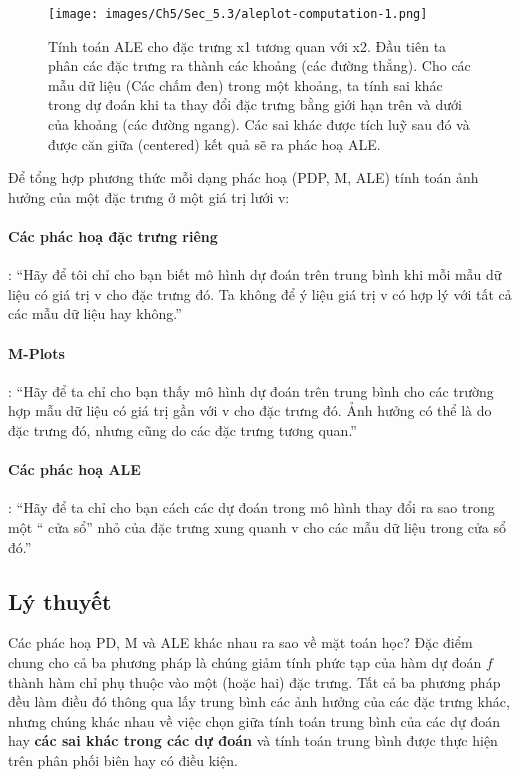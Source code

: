 \begin{figure*}[h!]
	\centering
	\texttt{[image: images/Ch5/Sec\_5.3/aleplot-computation-1.png]}
	\label{fig:5_12}
	\caption{Tính toán ALE cho đặc trưng x1 tương quan với x2. Đầu tiên ta phân các đặc trưng ra thành các khoảng (các đường thẳng). Cho các mẫu dữ liệu (Các chấm đen) trong một khoảng, ta tính sai khác trong dự đoán khi ta thay đổi đặc trưng bằng giới hạn trên và dưới của khoảng (các đường ngang). Các sai khác được tích luỹ sau đó và được căn giữa (centered) kết quả sẽ ra phác hoạ ALE.}
\end{figure*}

Để tổng hợp phương thức mỗi dạng phác hoạ (PDP, M, ALE) tính toán ảnh hưởng của một đặc trưng ở một giá trị lưới v:

\paragraph{Các phác hoạ đặc trưng riêng}: ``Hãy để tôi chỉ cho bạn biết mô hình dự đoán trên trung bình khi mỗi mẫu dữ liệu có giá trị v cho đặc trưng đó. Ta không để ý liệu giá trị v có hợp lý với tất cả các mẫu dữ liệu hay không.''
\paragraph{M-Plots}: ``Hãy để ta chỉ cho bạn thấy mô hình dự đoán trên trung bình cho các trường hợp mẫu dữ liệu có giá trị gần với v cho đặc trưng đó. Ảnh hưởng có thể là do đặc trưng đó, nhưng cũng do các đặc trưng tương quan.''
\paragraph{Các phác hoạ ALE}: ``Hãy để ta chỉ cho bạn cách các dự đoán trong mô hình thay đổi ra sao trong một `` cửa sổ'' nhỏ của đặc trưng xung quanh v cho các mẫu dữ liệu trong cửa sổ đó.''

\subsection{Lý thuyết}
Các phác hoạ PD, M và ALE khác nhau ra sao về mặt toán học? Đặc điểm chung cho cả ba phương pháp là chúng giảm tính phức tạp của hàm dự đoán $f$ thành hàm chỉ phụ thuộc vào một (hoặc hai) đặc trưng. Tất cả ba phương pháp đều làm điều đó thông qua lấy trung bình các ảnh hưởng của các đặc trưng khác, nhưng chúng khác nhau về việc chọn giữa tính toán trung bình của các dự đoán hay \textbf{các sai khác trong các dự đoán} và tính toán trung bình được thực hiện trên phân phối biên hay có điều kiện.

